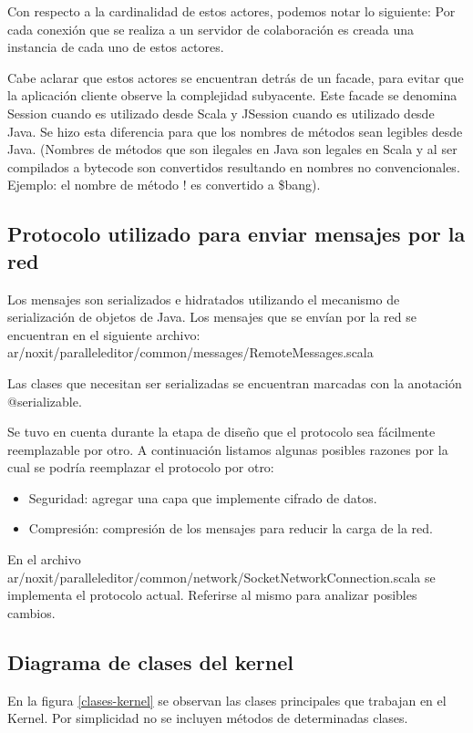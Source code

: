 \documentclass[12pt,a4paper]{article}
\begin{document}
Con respecto a la cardinalidad de estos actores, podemos notar lo siguiente:
Por cada conexión que se realiza a un servidor de colaboración es creada una instancia de cada uno de estos actores.

Cabe aclarar que estos actores se encuentran detrás de un facade, para evitar que la aplicación cliente observe la
complejidad subyacente. Este facade se denomina Session cuando es utilizado desde Scala y JSession cuando es utilizado desde Java.
Se hizo esta diferencia para que los nombres de métodos sean legibles desde Java. (Nombres de métodos que son ilegales en Java son
legales en Scala y al ser compilados a bytecode son convertidos resultando en nombres no convencionales. Ejemplo: el nombre de 
método ! es convertido a \$bang).


\subsection{Protocolo utilizado para enviar mensajes por la red}
Los mensajes son serializados e hidratados utilizando el mecanismo de serialización de objetos de Java. Los mensajes que se
envían por la red se encuentran en el siguiente archivo:
ar/noxit/paralleleditor/common/messages/RemoteMessages.scala

Las clases que necesitan ser serializadas se encuentran marcadas con la anotación @serializable.

Se tuvo en cuenta durante la etapa de diseño que el protocolo sea fácilmente reemplazable por otro. A continuación listamos
algunas posibles razones por la cual se podría reemplazar el protocolo por otro:

\begin{itemize}
	\item Seguridad: agregar una capa que implemente cifrado de datos.
	\item Compresión: compresión de los mensajes para reducir la carga de la red.
\end{itemize}

En el archivo ar/noxit/paralleleditor/common/network/SocketNetworkConnection.scala se implementa el protocolo actual. Referirse
al mismo para analizar posibles cambios.

\subsection{Diagrama de clases del kernel}
En la figura \ref{clases-kernel} se observan las clases principales que trabajan en el Kernel. Por simplicidad no se 
incluyen métodos de determinadas clases.
\end{document}
